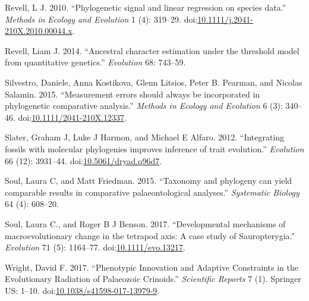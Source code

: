 \documentclass[]{article}
\begin{document}
\hypertarget{ref-Revell2010}{}
Revell, L J. 2010. ``Phylogenetic signal and linear regression on
species data.'' \emph{Methods in Ecology and Evolution} 1 (4): 319--29.
doi:\href{https://doi.org/10.1111/j.2041-210X.2010.00044.x}{10.1111/j.2041-210X.2010.00044.x}.

\hypertarget{ref-Revell2014}{}
Revell, Liam J. 2014. ``Ancestral character estimation under the
threshold model from quantitative genetics.'' \emph{Evolution} 68:
743--59.

\hypertarget{ref-Silvestro2015b}{}
Silvestro, Daniele, Anna Kostikova, Glenn Litsios, Peter B. Pearman, and
Nicolas Salamin. 2015. ``Measurement errors should always be
incorporated in phylogenetic comparative analysis.'' \emph{Methods in
Ecology and Evolution} 6 (3): 340--46.
doi:\href{https://doi.org/10.1111/2041-210X.12337}{10.1111/2041-210X.12337}.

\hypertarget{ref-Slater2012}{}
Slater, Graham J, Luke J Harmon, and Michael E Alfaro. 2012.
``Integrating fossils with molecular phylogenies improves inference of
trait evolution.'' \emph{Evolution} 66 (12): 3931--44.
doi:\href{https://doi.org/10.5061/dryad.q96d7}{10.5061/dryad.q96d7}.

\hypertarget{ref-Soul2015}{}
Soul, Laura C, and Matt Friedman. 2015. ``Taxonomy and phylogeny can
yield comparable results in comparative palaeontological analyses.''
\emph{Systematic Biology} 64 (4): 608--20.

\hypertarget{ref-Soul2017}{}
Soul, Laura C., and Roger B J Benson. 2017. ``Developmental mechanisms
of macroevolutionary change in the tetrapod axis: A case study of
Sauropterygia.'' \emph{Evolution} 71 (5): 1164--77.
doi:\href{https://doi.org/10.1111/evo.13217}{10.1111/evo.13217}.

\hypertarget{ref-Wright2017}{}
Wright, David F. 2017. ``Phenotypic Innovation and Adaptive Constraints
in the Evolutionary Radiation of Palaeozoic Crinoids.'' \emph{Scientific
Reports} 7 (1). Springer US: 1--10.
doi:\href{https://doi.org/10.1038/s41598-017-13979-9}{10.1038/s41598-017-13979-9}.
\end{document}
